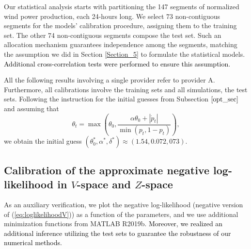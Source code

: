 \documentclass[11pt]{article}
\theoremstyle{definition}
\newcommand{\red}{\textcolor{black}}
\begin{document}
Our statistical analysis starts with partitioning the 147 segments of normalized wind power production, each 24-hours long. We select 73 non-contiguous segments for the models' calibration procedure, assigning them to the training set. The other 74 non-contiguous segments compose the test set. Such an allocation mechanism guarantees independence among the segments, matching the assumption we did in Section \ref{Section_5} to formulate the statistical models. \red{Additional cross-correlation tests were performed to ensure this assumption.}

All the following results involving a single provider refer to provider A. Furthermore, all calibrations involve the training sets and all simulations, the test sets. Following the instruction for the initial guesses from Subsection $\ref{opt_sec}$ and assuming that
\begin{equation*}
\theta_t=\max\left(\theta_0,\frac{\alpha\theta_0+|\dot{p}_t|}{\min(p_t,1-p_t)}\right),
\end{equation*}
we obtain the initial guess $(\theta_0^*,\alpha^*,\delta^*)\approx(1.54,0.072,073)$.

\subsection{Calibration of the approximate negative log-likelihood in $V$-space and $Z$-space}

As an auxiliary verification, we plot the negative log-likelihood (negative version of (\ref{eq:loglikelihoodV})) as a function of the parameters, and we use additional minimization functions from MATLAB R2019b. \red{Moreover, we realized an additional inference utilizing the test sets to guarantee the robustness of our numerical methods.}
\end{document}
